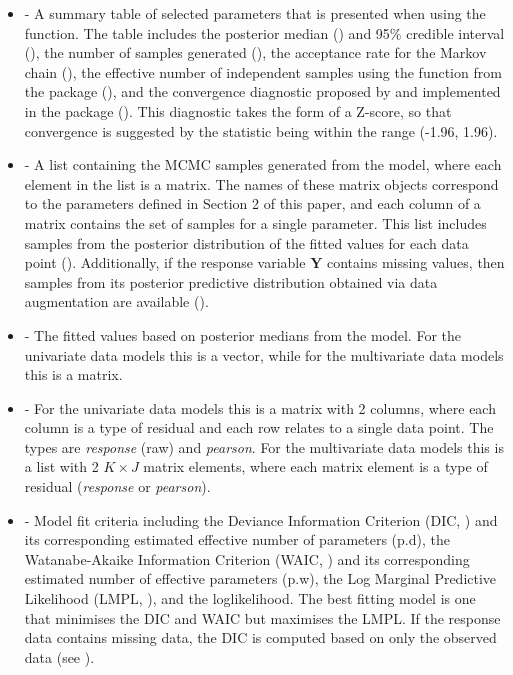 \documentclass[article,shortnames,nojss]{jss}
\begin{document}
\begin{itemize}
\item {} - A summary table of selected parameters that is presented when using the  function. The table includes the posterior median () and 95$\%$ credible interval (), the number of samples generated (), the acceptance rate for the Markov chain (), the effective number of independent samples using the   function from the  package (), and the convergence  diagnostic proposed by \cite{geweke1992} and implemented in the  package (). This diagnostic takes the form of a Z-score, so that convergence is suggested by the statistic being within the range (-1.96, 1.96).

\item {} - A list containing the MCMC samples generated from the model, where each element in the list is a matrix. The names of these matrix objects correspond to the parameters defined in Section 2 of this paper, and each column of a matrix contains the set of samples for a single parameter. This list includes samples from the posterior distribution of the fitted values for each data point (). Additionally, if the response variable $\mathbf{Y}$ contains missing values, then samples from its posterior predictive distribution obtained via data augmentation are available ().

\item {} - The fitted values based on posterior medians from the model. For the univariate data models this is a vector, while for the multivariate data models this is a matrix.

\item {} - For the univariate data models this is a matrix with 2 columns, where each column is a type of residual and each row relates to a single data point. The types are \emph{response} (raw) and \emph{pearson}. For the multivariate data models this is a list with 2 $K\times J$ matrix elements, where each matrix element is a type of residual (\emph{response} or \emph{pearson}). 

\item {} - Model fit criteria including the Deviance Information Criterion (DIC, \cite{spiegelhalter2002}) and its corresponding estimated effective number of parameters (p.d), the Watanabe-Akaike Information Criterion (WAIC, \cite{watanabe2010}) and its corresponding estimated number of effective parameters (p.w), the Log Marginal Predictive Likelihood (LMPL, \cite{congdon2005}), and the loglikelihood. The best fitting model is one that minimises the DIC and WAIC but maximises the LMPL. If the response data contains missing data, the DIC is computed based on only the observed data (see \cite{celeux2006}).


\end{itemize}
\end{document}

